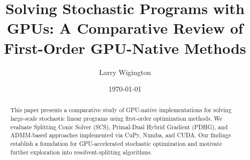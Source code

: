 \documentclass[11pt]{article}
\title{Solving Stochastic Programs with GPUs: A Comparative Review of First-Order GPU-Native Methods}
\author{Larry Wigington}
\date{\today}
\begin{document}
\maketitle

\begin{abstract}
This paper presents a comparative study of GPU-native implementations for solving large-scale stochastic linear programs using first-order optimization methods. We evaluate Splitting Conic Solver (SCS), Primal-Dual Hybrid Gradient (PDHG), and ADMM-based approaches implemented via CuPy, Numba, and CUDA. Our findings establish a foundation for GPU-accelerated stochastic optimization and motivate further exploration into resolvent-splitting algorithms.
\end{abstract}










\appendix

\end{document}
